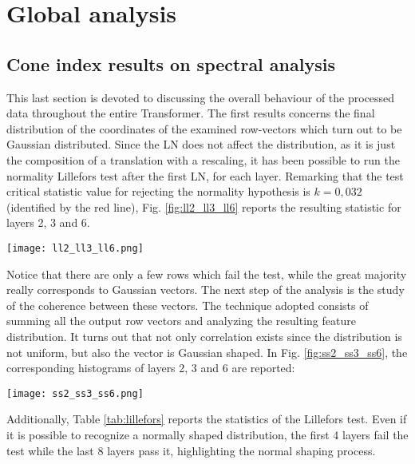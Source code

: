 \documentclass[11pt,a4paper,reqno]{amsart} %
\theoremstyle{definition}
\numberwithin{equation}{section}          %
\begin{document}
\section{Global analysis} 



\subsection{Cone index results on spectral analysis}


This last section is devoted to discussing the overall behaviour of the processed data throughout the entire Transformer. The first results concerns the final distribution of the coordinates of the examined row-vectors which turn out to be Gaussian distributed. Since the LN does not affect the distribution, as it is just the composition of a translation with a rescaling, it has been possible to run the normality Lillefors test after the first LN, for each layer. Remarking that the test critical statistic value for rejecting the normality hypothesis is $k=0,032$ (identified by the red line), Fig. \ref{fig:ll2_ll3_ll6} reports the resulting statistic for layers 2, 3 and 6.

\begin{figure*}[h!]
    \centering
    {\texttt{[image: ll2\_ll3\_ll6.png]}}
    \caption{Normality Lillefors test after the first LN, for layers 2 (a), 3 (b) and 6 (c).}
    \label{fig:ll2_ll3_ll6}
\end{figure*}
\noindent Notice that there are only a few rows which fail the test, while the great majority really corresponds to Gaussian vectors. The next step of the analysis is the study of the coherence between these vectors. The technique adopted consists of summing all the output row vectors and analyzing the resulting feature distribution. It turns out that not only correlation exists since the distribution is not uniform, but also the vector is Gaussian shaped. In Fig. \ref{fig:ss2_ss3_ss6}, the corresponding histograms of layers 2, 3 and 6 are reported:
\begin{figure*}[h!]
    \centering
    {\texttt{[image: ss2\_ss3\_ss6.png]}}
    \caption{Histograms of the sum of all the output row vectors of layer 2 (a), 3 (b) and 6 (c), showing the mean distribution of the features.}
    \label{fig:ss2_ss3_ss6}
\end{figure*}

Additionally, Table \ref{tab:lillefors} reports the statistics of the Lillefors test. Even if it is possible to recognize a normally shaped distribution, the first 4 layers fail the test while the last 8 layers pass it, highlighting the normal shaping process.
\end{document}
